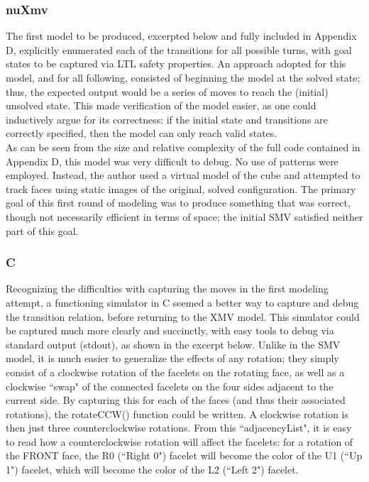 \documentclass{article}
\begin{document}
\subsubsection {nuXmv}
The first model to be produced, excerpted below and fully included in Appendix D, explicitly enumerated each of the transitions for all possible turns, with goal states to be captured via LTL safety properties. An approach adopted for this model, and for all following, consisted of beginning the model at the solved state; thus, the expected output would be a series of moves to reach the (initial) unsolved state. This made verification of the model easier, as one could inductively argue for its correctness: if the initial state and transitions are correctly specified, then the model can only reach valid states.\\

\noindent As can be seen from the size and relative complexity of the full code contained in Appendix D, this model was very difficult to debug. No use of patterns were employed. Instead, the author used a virtual model of the cube and attempted to track faces using static images of the original, solved configuration. The primary goal of this first round of modeling was to produce something that was correct, though not necessarily efficient in terms of space; the initial SMV satisfied neither part of this goal.

\vspace{0.2cm}

\vspace{-0.6cm}
\subsubsection {C}
Recognizing the difficulties with capturing the moves in the first modeling attempt, a functioning simulator in C seemed a better way to capture and debug the transition relation, before returning to the XMV model. This simulator could be captured much more clearly and succinctly, with easy tools to debug via standard output (stdout), as shown in the excerpt below. Unlike in the SMV model, it is much easier to generalize the effects of any rotation; they simply consist of a clockwise rotation of the facelets on the rotating face, as well as a clockwise ``swap" of the connected facelets on the four sides adjacent to the current side. By capturing this for each of the faces (and thus their associated rotations), the rotateCCW() function could be written. A clockwise rotation is then just three counterclockwise rotations. From this ``adjacencyList", it is easy to read how a counterclockwise rotation will affect the facelets: for a rotation of the FRONT face, the R0 (``Right 0") facelet will become the color of the U1 (``Up 1") facelet, which will become the color of the L2 (``Left 2") facelet.
\end{document}
